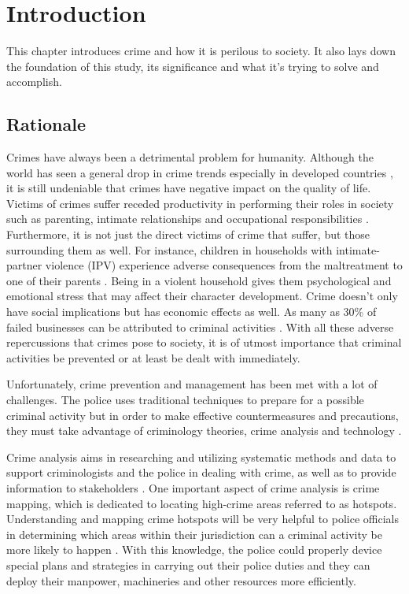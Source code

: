\section{Introduction}
    This chapter introduces crime and how it is perilous to society. It also lays down the foundation of this study, its significance and what it's trying to solve and accomplish.
\subsection{Rationale}

    Crimes have always been a detrimental problem for humanity. Although the world has seen a general drop in crime trends especially in developed countries \cite{dijk2007criminal}, it is still undeniable that crimes have negative impact on the quality of life. Victims of crimes suffer receded productivity in performing their roles in society such as parenting, intimate relationships and occupational responsibilities \cite{hanson2010impact}. Furthermore, it is not just the direct victims of crime that suffer, but those surrounding them as well. For instance, children in households with intimate-partner violence (IPV) experience adverse consequences from the maltreatment to one of their parents \cite{casanueva2008quality}. Being in a violent household gives them psychological and emotional stress that may affect their character development. Crime doesn’t only have social implications but has economic effects as well. As many as 30\% of failed businesses can be attributed to criminal activities \cite{bressler2009impact}. With all these adverse repercussions that crimes pose to society, it is of utmost importance that criminal activities be prevented or at least be dealt with immediately.

    Unfortunately, crime prevention and management has been met with a lot of challenges. The police uses traditional techniques to prepare for a possible criminal activity but in order to make effective countermeasures and precautions, they must take advantage of criminology theories, crime analysis and technology \cite{polat2007spatio}.

    Crime analysis aims in researching and utilizing systematic methods and data to support criminologists and the police in dealing with crime, as well as to provide information to stakeholders \cite{santos2012crime}. One important aspect of crime analysis is crime mapping, which is dedicated to locating high-crime areas referred to as hotspots. Understanding and mapping crime hotspots will be very helpful to police officials in determining which areas within their jurisdiction can a criminal activity be more likely to happen \cite{eck2005mapping}. With this knowledge, the police could properly device special plans and strategies in carrying out their police duties and they can deploy their manpower, machineries and other resources more efficiently.

